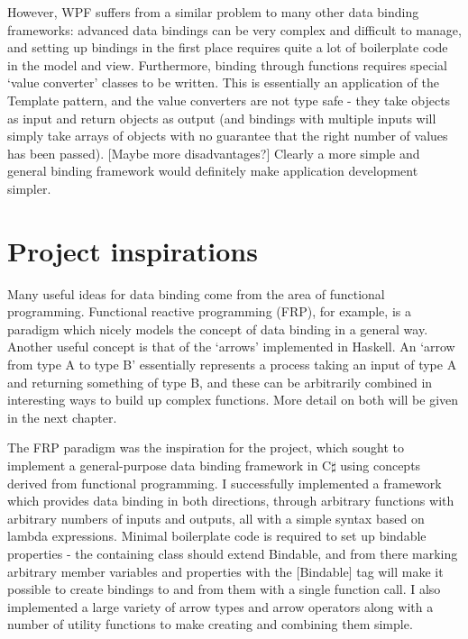 \documentclass[12pt,twoside,notitlepage]{report}
\begin{document}
However, WPF suffers from a similar problem to many other data binding frameworks: advanced data bindings can be very complex and difficult to manage, and setting up bindings in the first place requires quite a lot of boilerplate code in the model and view. Furthermore, binding through functions requires special ‘value converter’ classes to be written. This is essentially an application of the Template pattern, and the value converters are not type safe - they take objects as input and return objects as output (and bindings with multiple inputs will simply take arrays of objects with no guarantee that the right number of values has been passed). [Maybe more disadvantages?] Clearly a more simple and general binding framework would definitely make application development simpler.

\section{Project inspirations}

Many useful ideas for data binding come from the area of functional programming. Functional reactive programming (FRP), for example, is a paradigm which nicely models the concept of data binding in a general way. Another useful concept is that of the `arrows' implemented in Haskell. An `arrow from type A to type B' essentially represents a process taking an input of type A and returning something of type B, and these can be arbitrarily combined in interesting ways to build up complex functions. More detail on both will be given in the next chapter.

The FRP paradigm was the inspiration for the project, which sought to implement a general-purpose data binding framework in C$\sharp$ using concepts derived from functional programming. I successfully implemented a framework which provides data binding in both directions, through arbitrary functions with arbitrary numbers of inputs and outputs, all with a simple syntax based on lambda expressions. Minimal boilerplate code is required to set up bindable properties - the containing class should extend Bindable, and from there marking arbitrary member variables and properties with the [Bindable] tag will make it possible to create bindings to and from them with a single function call. I also implemented a large variety of arrow types and arrow operators along with a number of utility functions to make creating and combining them simple.

\cleardoublepage
\end{document}
